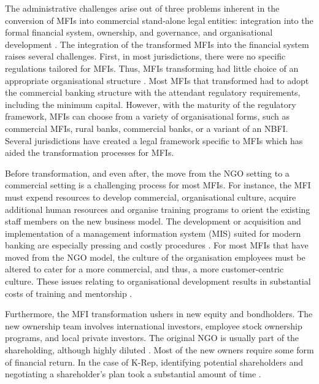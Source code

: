 \documentclass[a4paper,nobind]{templates/ociamthesis}
\begin{document}
The administrative challenges arise out of three problems inherent in the conversion of MFIs into commercial stand-alone legal entities: integration into the formal financial system, ownership, and governance, and organisational development \autocite{campion1999institutional,lauer2008transforming,mori2014boards}. The integration of the transformed MFIs into the financial system raises several challenges. First, in most jurisdictions, there were no specific regulations tailored for MFIs. Thus, MFIs transforming had little choice of an appropriate organisational structure \autocite{campion1999institutional}. Most MFIs that transformed had to adopt the commercial banking structure with the attendant regulatory requirements, including the minimum capital. However, with the maturity of the regulatory framework, MFIs can choose from a variety of organisational forms, such as commercial MFIs, rural banks, commercial banks, or a variant of an NBFI. Several jurisdictions have created a legal framework specific to MFIs which has aided the transformation processes for MFIs.

Before transformation, and even after, the move from the NGO setting to a commercial setting is a challenging process for most MFIs. For instance, the MFI must expend resources to develop commercial, organisational culture, acquire additional human resources and organise training programs to orient the existing staff members on the new business model. The development or acquisition and implementation of a management information system (MIS) suited for modern banking are especially pressing and costly procedures \autocite{campion1999institutional}. For most MFIs that have moved from the NGO model, the culture of the organisation employees must be altered to cater for a more commercial, and thus, a more customer-centric culture. These issues relating to organisational development results in substantial costs of training and mentorship \autocite{campion1999institutional}.

Furthermore, the MFI transformation ushers in new equity and bondholders. The new ownership team involves international investors, employee stock ownership programs, and local private investors. The original NGO is usually part of the shareholding, although highly diluted \autocite{perilleux2012surplus}. Most of the new owners require some form of financial return. In the case of K-Rep, identifying potential shareholders and negotiating a shareholder's plan took a substantial amount of time \autocite{mersland2009cost,servin2012ownership,campion1999institutional}.
\end{document}
